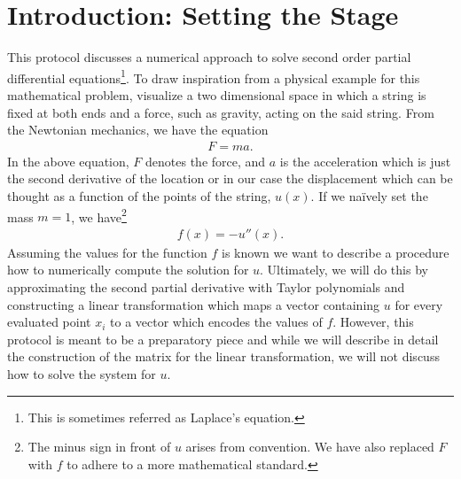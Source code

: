 \section{Introduction: Setting the Stage}

This protocol discusses a numerical approach to solve second order partial differential equations\footnote{This is sometimes referred as Laplace's equation.}. To draw inspiration from a physical example for this mathematical problem, visualize a two dimensional space in which a string is fixed at both ends and a force, such as gravity, acting on the said string. From the Newtonian mechanics, we have the equation
\begin{align*}
	F = ma \text{.}
\end{align*}
In the above equation, \(F\) denotes the force, and \(a\) is the acceleration which is just the second derivative of the location or in our case the displacement which can be thought as a function of the points of the string, \(u(x)\). If we na{\"i}vely set the mass \(m = 1\), we have\footnote{The minus sign in front of \(u\) arises from convention. We have also replaced \(F\) with \(f\) to adhere to a more mathematical standard.}
\begin{align*}
	f(x) = - u''(x) \text{.}
\end{align*}
Assuming the values for the function \(f\) is known we want to describe a procedure how to numerically compute the solution for \(u\). Ultimately, we will do this by approximating the second partial derivative with Taylor polynomials and constructing a linear transformation which maps a vector containing \(u\) for every evaluated point \(x_i\) to a vector which encodes the values of \(f\).
However, this protocol is meant to be a preparatory piece and while we will describe in detail the construction of the matrix for the linear transformation, we will not discuss how to solve the system for \(u\).